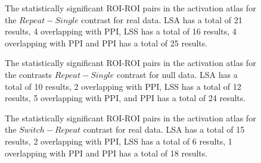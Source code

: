 \documentclass[phd,appendix,figures]{uithesis}
\begin{document}
\begin{figure}[H]
  \ContinuedFloat
  \centering


  \caption{
      The statistically significant ROI-ROI pairs in the activation atlas
      for the $Repeat - Single$ contrast for real data.
      LSA has a total of 21 results, 4 overlapping with PPI,
      LSS has a total of 16 results, 4 overlapping with PPI and
      PPI has a total of 25 results.
  }
  \label{fig:data-real_type-brain_atlas-activation_contrast-repeatxsingle}
\end{figure}

\begin{figure}[H]
  \ContinuedFloat
  \centering


  \caption{
      The statistically significant ROI-ROI pairs in the activation atlas
      for the contrasts $Repeat - Single$ contrast for null data.
      LSA has a total of 10 results, 2 overlapping with PPI,
      LSS has a total of 12 results, 5 overlapping with PPI,
      and PPI has a total of 24 results.
  }
  \label{fig:data-null_type-brain_atlas-activation_contrast-repeatxsingle}
\end{figure}

\begin{figure}[H]
  \ContinuedFloat
  \centering


  \caption{
      The statistically significant ROI-ROI pairs in the activation atlas
      for the $Switch - Repeat$ contrast for real data.
      LSA has a total of 15 results, 2 overlapping with PPI,
      LSS has a total of 6 results, 1 overlapping with PPI and
      PPI has a total of 18 results.
  }
  \label{fig:data-real_type-brain_atlas-activation_contrast-switchxrepeat}
\end{figure}
\end{document}
